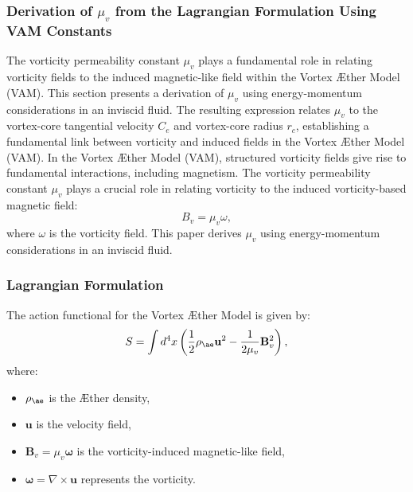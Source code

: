 \subsubsection*{Derivation of \( \mu_v \) from the Lagrangian Formulation Using VAM Constants}
The vorticity permeability constant \( \mu_v \) plays a fundamental role in relating vorticity fields to the induced magnetic-like field within the Vortex Æther Model (VAM). This section presents a derivation of \( \mu_v \) using energy-momentum considerations in an inviscid fluid. The resulting expression relates \(\mu_v\) to the vortex-core tangential velocity \(C_e\) and vortex-core radius \(r_c\), establishing a fundamental link between vorticity and induced fields in the Vortex \AE ther Model (VAM). In the Vortex \AE ther Model (VAM), structured vorticity fields give rise to fundamental interactions, including magnetism. The vorticity permeability constant \( \mu_v \) plays a crucial role in relating vorticity to the induced vorticity-based magnetic field:
    \begin{equation}
        B_v = \mu_v \omega,
    \end{equation}
    where \(\omega\) is the vorticity field. This paper derives \(\mu_v\) using energy-momentum considerations in an inviscid fluid.

    \subsubsection*{Lagrangian Formulation}
    The action functional for the Vortex Æther Model is given by:
    \begin{equation}
        S = \int d^4x \left( \frac{1}{2} \rho_{\ae} \mathbf{u}^2 - \frac{1}{2 \mu_v} \mathbf{B}_v^2 \right),
    \end{equation}
    where:
    \begin{itemize}
        \item \( \rho_{\ae} \) is the Æther density,
        \item \( \mathbf{u} \) is the velocity field,
        \item \( \mathbf{B}_v = \mu_v \boldsymbol{\omega} \) is the vorticity-induced magnetic-like field,
        \item \( \boldsymbol{\omega} = \nabla \times \mathbf{u} \) represents the vorticity.
    \end{itemize}

